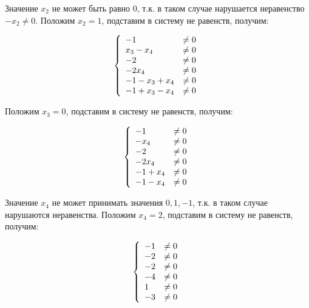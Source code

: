 \documentclass[14pt]{mmcs-article}
\begin{document}
Значение $x_2$ не может быть равно $0$, т.к. в таком случае нарушается неравенство $- x_2 \neq 0$. Положим $x_2 = 1$, подставим в систему не равенств, получим:

\begin{equation}
    \centering
    \left\{
        \begin{array}{ll}
            - 1 &\neq 0\\
            x_3 - x_4 &\neq 0\\
            - 2 &\neq 0\\
            - 2 x_4 &\neq 0\\
            - 1 - x_3 + x_4 &\neq 0\\
            - 1 + x_3 - x_4 &\neq 0\\
        \end{array}
    \right.
    \label{eqs:cycle_search_neqs}
\end{equation}

Положим $x_3 = 0$, подставим в систему не равенств, получим:

\begin{equation}
    \centering
    \left\{
        \begin{array}{ll}
            - 1 &\neq 0\\
            - x_4 &\neq 0\\
            - 2 &\neq 0\\
            - 2 x_4 &\neq 0\\
            - 1 + x_4 &\neq 0\\
            - 1 - x_4 &\neq 0\\
        \end{array}
    \right.
    \label{eqs:cycle_search_neqs}
\end{equation}

Значение $x_4$ не может принимать значения $0, 1, -1$, т.к. в таком случае нарушаются неравенства. Положим $x_4 = 2$, подставим в систему не равенств, получим:

\begin{equation}
    \centering
    \left\{
        \begin{array}{ll}
            - 1 &\neq 0\\
            - 2 &\neq 0\\
            - 2 &\neq 0\\
            - 4 &\neq 0\\
            1 &\neq 0\\
            - 3 &\neq 0\\
        \end{array}
    \right.
    \label{eqs:cycle_search_neqs}
\end{equation}
\end{document}
